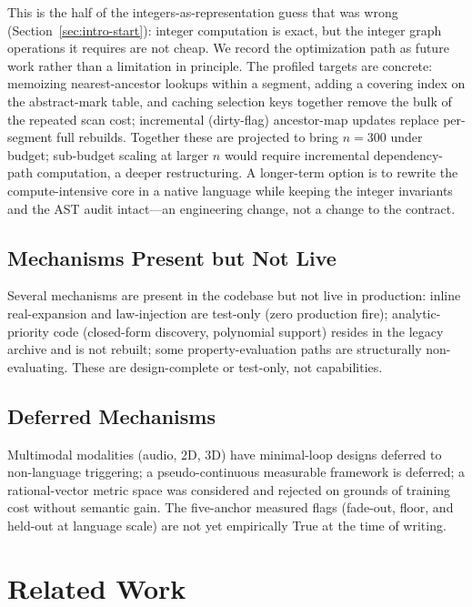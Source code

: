 \documentclass[11pt,a4paper]{article}
\begin{document}
This is the half of the integers-as-representation guess that was wrong
(Section~\ref{sec:intro-start}): integer computation is exact, but the
integer graph operations it requires are not cheap. We record the
optimization path as future work rather than a limitation in principle.
The profiled targets are concrete: memoizing nearest-ancestor lookups
within a segment, adding a covering index on the abstract-mark table, and
caching selection keys together remove the bulk of the repeated scan
cost; incremental (dirty-flag) ancestor-map updates replace per-segment
full rebuilds. Together these are projected to bring $n=300$ under
budget; sub-budget scaling at larger $n$ would require incremental
dependency-path computation, a deeper restructuring. A longer-term
option is to rewrite the compute-intensive core in a native language
while keeping the integer invariants and the AST audit intact---an
engineering change, not a change to the contract.

\subsection{Mechanisms Present but Not Live}
Several mechanisms are present in the codebase but not live in
production: inline real-expansion and law-injection are test-only (zero
production fire); analytic-priority code (closed-form discovery,
polynomial support) resides in the legacy archive and is not rebuilt;
some property-evaluation paths are structurally non-evaluating. These are
design-complete or test-only, not capabilities.

\subsection{Deferred Mechanisms}
Multimodal modalities (audio, 2D, 3D) have minimal-loop designs deferred
to non-language triggering; a pseudo-continuous measurable framework is
deferred; a rational-vector metric space was considered and rejected on
grounds of training cost without semantic gain. The five-anchor measured
flags (fade-out, floor, and held-out at language scale) are not yet
empirically True at the time of writing.

\section{Related Work}
\label{sec:related}
\end{document}
